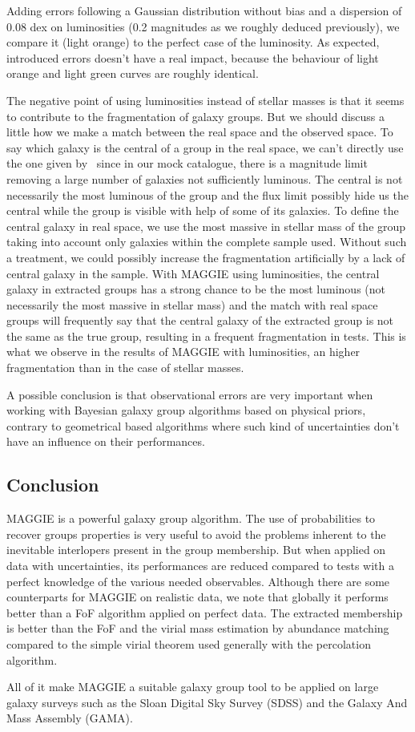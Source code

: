 Adding errors following a Gaussian distribution without bias and a dispersion
of 0.08 dex on luminosities (0.2 magnitudes as we roughly deduced previously),
we compare it (light orange) to the perfect case of the luminosity. As
expected, introduced errors doesn't have a real impact, because the behaviour
of light orange and light green curves are roughly identical.

The negative point of using luminosities instead of stellar masses is that it
seems to contribute to the fragmentation of galaxy groups. But we should
discuss a little how we make a match between the real space and the observed
space. To say which galaxy is the central of a group in the real space, we
can't directly use the one given by~\cite{Guo+11} since in our mock catalogue,
there is a magnitude limit removing a large number of galaxies not sufficiently
luminous. The central is not necessarily the most luminous of the group and the
flux limit possibly hide us the central while the group is visible with help of
some of its galaxies. To define the central galaxy in real space, we use the
most massive in stellar mass of the group taking into account only galaxies
within the complete sample used. Without such a treatment, we could possibly
increase the fragmentation artificially by a lack of central galaxy in the
sample. With MAGGIE using luminosities, the central galaxy in extracted groups
has a strong chance to be the most luminous (not necessarily the most massive
in stellar mass) and the match with real space groups will frequently say that
the central galaxy of the extracted group is not the same as the true group,
resulting in a frequent fragmentation in tests. This is what we observe in the
results of MAGGIE with luminosities, an higher fragmentation than in the case
of stellar masses.

A possible conclusion is that observational errors are very important when
working with Bayesian galaxy group algorithms based on physical priors,
contrary to geometrical based algorithms where such kind of uncertainties don't
have an influence on their performances.

\subsection{Conclusion}
\label{sub:maggie_discussion_conclusion}

MAGGIE is a powerful galaxy group algorithm. The use of probabilities to
recover groups properties is very useful to avoid the problems inherent to the
inevitable interlopers present in the group membership. But when applied on
data with uncertainties, its performances are reduced compared to tests with a
perfect knowledge of the various needed observables. Although there are some
counterparts for MAGGIE on realistic data, we note that globally it performs
better than a FoF algorithm applied on perfect data. The extracted membership
is better than the FoF and the virial mass estimation by abundance matching
compared to the simple virial theorem used generally with the percolation
algorithm.

All of it make MAGGIE a suitable galaxy group tool to be applied on large
galaxy surveys such as the Sloan Digital Sky Survey (SDSS) and the Galaxy And
Mass Assembly (GAMA).


